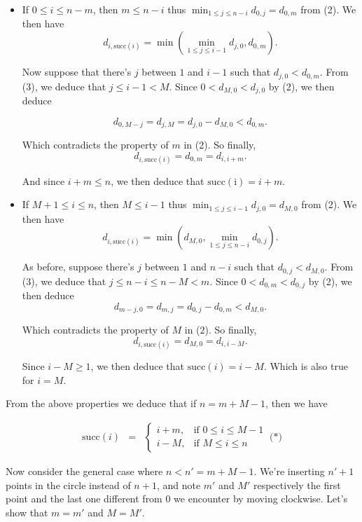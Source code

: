 \documentclass[a4paper,12pt]{article}
\begin{document}
\begin{itemize}
\item If $0\le i \le n-m$, then $m\le n-i$ thus $\min_{1\le j\le
  n-i}d_{0,j} = d_{0,m}$ from (2).  We then have
  \[ d_{i,\mathrm{succ}(i)} = \min\left( \min_{1\le j\le i-1}d_{j,0},
  d_{0,m}\right).\]

  Now suppose that there's $j$ between $1$ and $i-1$ such that
  $d_{j,0} < d_{0, m}$.  From (3), we deduce that $j\le i-1 < M$.
  Since $ 0 < d_{M,0} < d_{j,0}$ by (2), we then deduce

  \[ d_{0,M-j} = d_{j, M} = d_{j, 0} - d_{M, 0} < d_{0, m}.\]

  Which contradicts the property of $m$ in (2).  So finally,
  \[d_{i,\mathrm{succ}(i)} = d_{0,m} = d_{i,i+m}.\]

  And since $i+m \le n$, we then deduce that $\mathrm{succ(i)} = i+m$.

\item If $M+1 \le i\le n$, then $M\le i-1$ thus $\min_{1\le j\le
  i-1}d_{j,0} = d_{M,0}$ from (2).  We then have
  \[ d_{i,\mathrm{succ}(i)} = \min\left(d_{M,0}, \min_{1\le j\le
    n-i}d_{0,j}\right).\]

  As before, suppose there's $j$ between $1$ and $n-i$ such that
  $d_{0,j} < d_{M,0}$.  From (3), we deduce that $j \le n-i\le n-M <
  m$.  Since $0 < d_{0, m} < d_{0, j}$ by (2), we then deduce
  \[ d_{m-j, 0} = d_{m, j} = d_{0, j} - d_{0, m} < d_{M, 0}.\]

  Which contradicts the property of $M$ in (2).  So finally,
  \[ d_{i,\mathrm{succ}(i)} = d_{M,0} = d_{i,i-M}.\]

  Since $i-M \ge 1$, we then deduce that $\mathrm{succ}(i) = i-M$.
  Which is also true for $i = M$.

\end{itemize}

From the above properties we deduce that if $n = m+M-1$, then we have

\begin{eqnarray*}
  \mathrm{succ}(i) &=& \left\{
  \begin{array}{ll}
    i+m,&\mbox{if $0\le i\le M-1$} \\
    i-M,&\mbox{if $M\le i\le n$}
  \end{array}
  \right.\ \mbox{(*)}
\end{eqnarray*}

Now consider the general case where $n < n'= m+M-1$.  We're inserting
$n'+1$ points in the circle instead of $n+1$, and note $m'$ and
$M'$ respectively the first point and the last one different from $0$
we encounter by moving clockwise.  Let's show that $m = m'$ and $M =
M'$.
\end{document}
